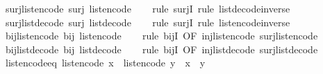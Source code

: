 \begin{isabellebody}
\isanewline
%
\endisadelimproof
\isanewline
{}\isamarkupfalse%
\ surj{\isacharunderscore}list{\isacharunderscore}encode{\isacharcolon}\ {\isachardoublequoteopen}surj\ list{\isacharunderscore}encode{\isachardoublequoteclose}\isanewline
%
\isadelimproof
\ \ %
\endisadelimproof
%
\isatagproof
{}\isamarkupfalse%
\ {\isacharparenleft}rule\ surjI{\isacharparenright}\ {\isacharparenleft}rule\ list{\isacharunderscore}decode{\isacharunderscore}inverse{\isacharparenright}%
\endisatagproof
{\isafoldproof}%
%
\isadelimproof
\isanewline
%
\endisadelimproof
\isanewline
{}\isamarkupfalse%
\ surj{\isacharunderscore}list{\isacharunderscore}decode{\isacharcolon}\ {\isachardoublequoteopen}surj\ list{\isacharunderscore}decode{\isachardoublequoteclose}\isanewline
%
\isadelimproof
\ \ %
\endisadelimproof
%
\isatagproof
{}\isamarkupfalse%
\ {\isacharparenleft}rule\ surjI{\isacharparenright}\ {\isacharparenleft}rule\ list{\isacharunderscore}encode{\isacharunderscore}inverse{\isacharparenright}%
\endisatagproof
{\isafoldproof}%
%
\isadelimproof
\isanewline
%
\endisadelimproof
\isanewline
{}\isamarkupfalse%
\ bij{\isacharunderscore}list{\isacharunderscore}encode{\isacharcolon}\ {\isachardoublequoteopen}bij\ list{\isacharunderscore}encode{\isachardoublequoteclose}\isanewline
%
\isadelimproof
\ \ %
\endisadelimproof
%
\isatagproof
{}\isamarkupfalse%
\ {\isacharparenleft}rule\ bijI\ {\isacharbrackleft}OF\ inj{\isacharunderscore}list{\isacharunderscore}encode\ surj{\isacharunderscore}list{\isacharunderscore}encode{\isacharbrackright}{\isacharparenright}%
\endisatagproof
{\isafoldproof}%
%
\isadelimproof
\isanewline
%
\endisadelimproof
\isanewline
{}\isamarkupfalse%
\ bij{\isacharunderscore}list{\isacharunderscore}decode{\isacharcolon}\ {\isachardoublequoteopen}bij\ list{\isacharunderscore}decode{\isachardoublequoteclose}\isanewline
%
\isadelimproof
\ \ %
\endisadelimproof
%
\isatagproof
{}\isamarkupfalse%
\ {\isacharparenleft}rule\ bijI\ {\isacharbrackleft}OF\ inj{\isacharunderscore}list{\isacharunderscore}decode\ surj{\isacharunderscore}list{\isacharunderscore}decode{\isacharbrackright}{\isacharparenright}%
\endisatagproof
{\isafoldproof}%
%
\isadelimproof
\isanewline
%
\endisadelimproof
\isanewline
{}\isamarkupfalse%
\ list{\isacharunderscore}encode{\isacharunderscore}eq{\isacharcolon}\ {\isachardoublequoteopen}list{\isacharunderscore}encode\ x\ {\isacharequal}\ list{\isacharunderscore}encode\ y\ {\isasymlongleftrightarrow}\ x\ {\isacharequal}\ y{\isachardoublequoteclose}\isanewline

\end{isabellebody}
